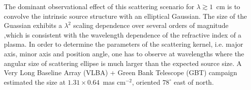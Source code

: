 The dominant observational effect of this scattering scenario for $\lambda \gtrsim 1$~cm is to convolve the intrinsic source structure with an elliptical Gaussian. The size of the Guassian exhibits a $\lambda^2$ scaling dependence over several orders of magnitude \citep[Fig.~\ref{fig:scattering_law}][]{Backer_1978, Shen_2005, Bower_2006, Lu_2011},which is consistent with the wavelength dependence of the refractive index of a plasma. In order to determine the parameters of the scattering kernel, i.e. major axis, minor axis and position angle,  one has to observe at wavelengths where the angular size of scattering ellipse is much larger than the expected source size. A Very Long Baseline Array (VLBA) + Green Bank Telescope (GBT) campaign \cite{Bower_2006} estimated the size at $1.31 \times 0.64$~mas cm$^{-2}$, oriented $78^\circ$ east of north. 


